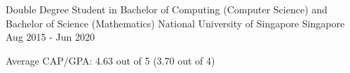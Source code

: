 

\begin{cventries}

  \cventry
  {Double Degree Student in Bachelor of Computing (Computer Science) and Bachelor of Science (Mathematics)} %
  {National University of Singapore} %
  {Singapore} %
  {Aug 2015 - Jun 2020} %
  {
    \begin{cvitems} %
    \item {Average CAP/GPA: 4.63 out of 5 (3.70 out of 4)}
    \end{cvitems}
  }

\end{cventries}
